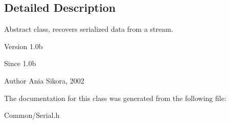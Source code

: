 \subsection{Detailed Description}
Abstract class, recovers serialized data from a stream. 

\begin{DoxyVersion}{Version}
1.\-0b 
\end{DoxyVersion}
\begin{DoxySince}{Since}
1.\-0b 
\end{DoxySince}
\begin{DoxyAuthor}{Author}
Ania Sikora, 2002 
\end{DoxyAuthor}


The documentation for this class was generated from the following file\-:\begin{DoxyCompactItemize}
\item 
Common/Serial.\-h\end{DoxyCompactItemize}

